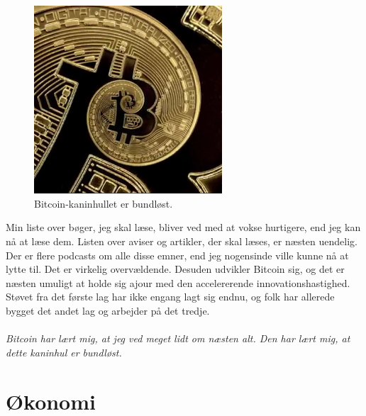 \documentclass[paper=6in:9in,pagesize=pdftex,
               headinclude=on,footinclude=on,12pt]{scrbook}
\begin{document}
\begin{figure}
  \centering
  \includegraphics[width=7cm]{assets/images/rabbit-hole-bottomless.png}
  \caption{Bitcoin-kaninhullet er bundløst.}
  \label{fig:rabbit-hole-bottomless}
\end{figure}

Min liste over bøger, jeg skal læse, bliver ved med at vokse hurtigere, end jeg kan nå at læse dem. Listen over aviser og artikler, der skal læses, er næsten uendelig. Der er flere podcasts om alle disse emner, end jeg nogensinde ville kunne nå at lytte til. Det er virkelig overvældende. Desuden udvikler Bitcoin sig, og det er næsten umuligt at holde sig ajour med den accelererende innovationshastighed. Støvet fra det første lag har ikke engang lagt sig endnu, og folk har allerede bygget det andet lag og arbejder på det tredje.\paragraph{Bitcoin har lært mig, at jeg ved meget lidt om næsten alt. Den har lært mig, at dette kaninhul er bundløst.}%
%
%
%
%
%

\part{Økonomi}
\label{ch:economics}
\end{document}
